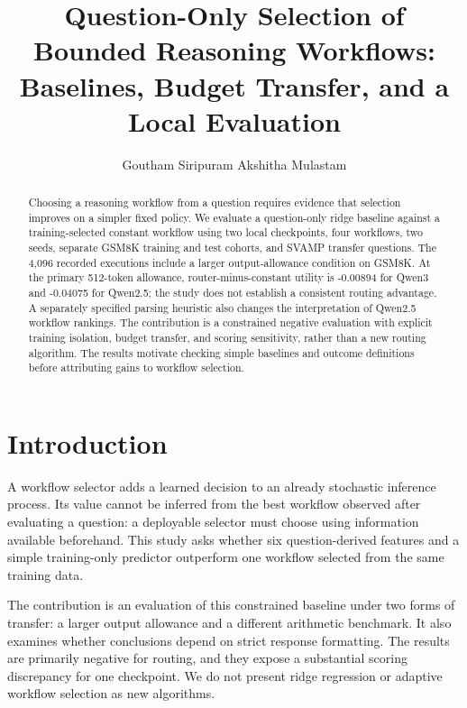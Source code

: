 \documentclass[10pt]{article}
\title{Question-Only Selection of Bounded Reasoning Workflows: Baselines, Budget Transfer, and a Local Evaluation}
\author{\name Goutham Siripuram \AND \name Akshitha Mulastam}
\begin{document}
\maketitle
\begingroup\renewcommand{\thefootnote}{}\endgroup
\begin{abstract}
Choosing a reasoning workflow from a question requires evidence that selection improves on a simpler fixed policy. We evaluate a question-only ridge baseline against a training-selected constant workflow using two local checkpoints, four workflows, two seeds, separate GSM8K training and test cohorts, and SVAMP transfer questions. The 4,096 recorded executions include a larger output-allowance condition on GSM8K. At the primary 512-token allowance, router-minus-constant utility is -0.00894 for Qwen3 and -0.04075 for Qwen2.5; the study does not establish a consistent routing advantage. A separately specified parsing heuristic also changes the interpretation of Qwen2.5 workflow rankings. The contribution is a constrained negative evaluation with explicit training isolation, budget transfer, and scoring sensitivity, rather than a new routing algorithm. The results motivate checking simple baselines and outcome definitions before attributing gains to workflow selection.
\end{abstract}
\section{Introduction}
A workflow selector adds a learned decision to an already stochastic inference process. Its value cannot be inferred from the best workflow observed after evaluating a question: a deployable selector must choose using information available beforehand. This study asks whether six question-derived features and a simple training-only predictor outperform one workflow selected from the same training data.

The contribution is an evaluation of this constrained baseline under two forms of transfer: a larger output allowance and a different arithmetic benchmark. It also examines whether conclusions depend on strict response formatting. The results are primarily negative for routing, and they expose a substantial scoring discrepancy for one checkpoint. We do not present ridge regression or adaptive workflow selection as new algorithms.
\end{document}
